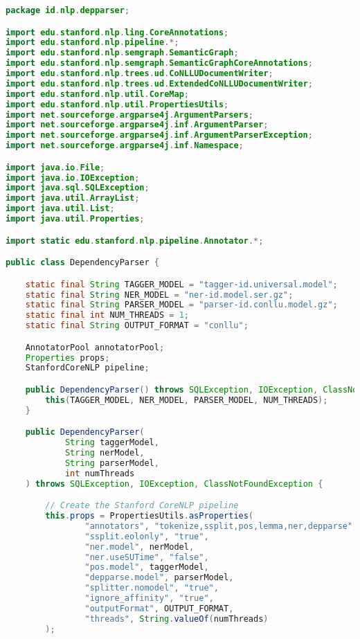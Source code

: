 \begin{lstlisting}[language=Java]
package id.nlp.depparser;

import edu.stanford.nlp.ling.CoreAnnotations;
import edu.stanford.nlp.pipeline.*;
import edu.stanford.nlp.semgraph.SemanticGraph;
import edu.stanford.nlp.semgraph.SemanticGraphCoreAnnotations;
import edu.stanford.nlp.trees.ud.CoNLLUDocumentWriter;
import edu.stanford.nlp.trees.ud.ExtendedCoNLLUDocumentWriter;
import edu.stanford.nlp.util.CoreMap;
import edu.stanford.nlp.util.PropertiesUtils;
import net.sourceforge.argparse4j.ArgumentParsers;
import net.sourceforge.argparse4j.inf.ArgumentParser;
import net.sourceforge.argparse4j.inf.ArgumentParserException;
import net.sourceforge.argparse4j.inf.Namespace;

import java.io.File;
import java.io.IOException;
import java.sql.SQLException;
import java.util.ArrayList;
import java.util.List;
import java.util.Properties;

import static edu.stanford.nlp.pipeline.Annotator.*;

public class DependencyParser {

    static final String TAGGER_MODEL = "tagger-id.universal.model";
    static final String NER_MODEL = "ner-id.model.ser.gz";
    static final String PARSER_MODEL = "parser-id.conllu.model.gz";
    static final int NUM_THREADS = 1;
    static final String OUTPUT_FORMAT = "conllu";

    AnnotatorPool annotatorPool;
    Properties props;
    StanfordCoreNLP pipeline;

    public DependencyParser() throws SQLException, IOException, ClassNotFoundException {
        this(TAGGER_MODEL, NER_MODEL, PARSER_MODEL, NUM_THREADS);
    }

    public DependencyParser(
            String taggerModel,
            String nerModel,
            String parserModel,
            int numThreads
    ) throws SQLException, IOException, ClassNotFoundException {

        // Create the Stanford CoreNLP pipeline
        this.props = PropertiesUtils.asProperties(
                "annotators", "tokenize,ssplit,pos,lemma,ner,depparse",
                "ssplit.eolonly", "true",
                "ner.model", nerModel,
                "ner.useSUTime", "false",
                "pos.model", taggerModel,
                "depparse.model", parserModel,
                "splitter.nomodel", "true",
                "ignore_affinity", "true",
                "outputFormat", OUTPUT_FORMAT,
                "threads", String.valueOf(numThreads)
        );


\end{lstlisting}
